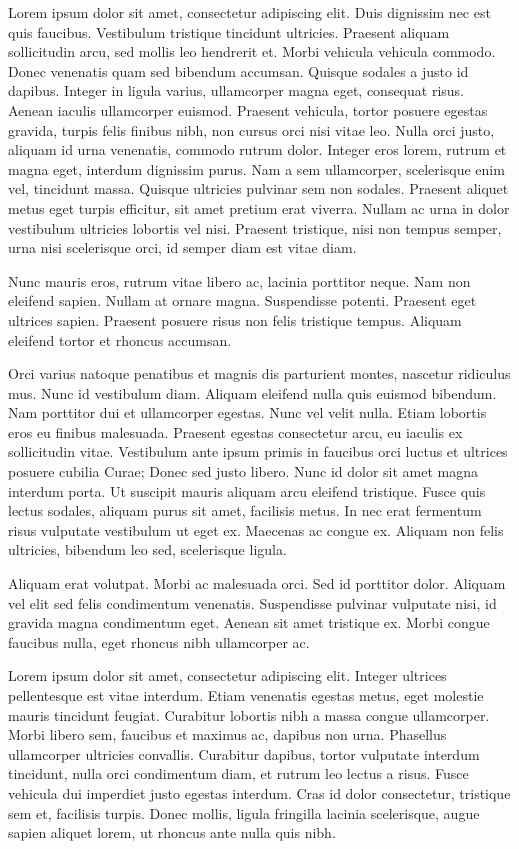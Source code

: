 \documentclass[a4paper,10pt,twoside]{article} %
\begin{document}
Lorem ipsum dolor sit amet, consectetur adipiscing elit.
Duis dignissim nec est quis faucibus.
Vestibulum tristique tincidunt ultricies.
Praesent aliquam sollicitudin arcu, sed mollis leo hendrerit et.
Morbi vehicula vehicula commodo.
Donec venenatis quam sed bibendum accumsan.
Quisque sodales a justo id dapibus.
Integer in ligula varius, ullamcorper magna eget, consequat risus.
Aenean iaculis ullamcorper euismod.
Praesent vehicula, tortor posuere egestas gravida, turpis felis finibus nibh, non cursus orci nisi vitae leo.
Nulla orci justo, aliquam id urna venenatis, commodo rutrum dolor.
Integer eros lorem, rutrum et magna eget, interdum dignissim purus.
Nam a sem ullamcorper, scelerisque enim vel, tincidunt massa.
Quisque ultricies pulvinar sem non sodales.
Praesent aliquet metus eget turpis efficitur, sit amet pretium erat viverra.
Nullam ac urna in dolor vestibulum ultricies lobortis vel nisi.
Praesent tristique, nisi non tempus semper, urna nisi scelerisque orci, id semper diam est vitae diam.

Nunc mauris eros, rutrum vitae libero ac, lacinia porttitor neque.
Nam non eleifend sapien.
Nullam at ornare magna.
Suspendisse potenti.
Praesent eget ultrices sapien.
Praesent posuere risus non felis tristique tempus.
Aliquam eleifend tortor et rhoncus accumsan.

Orci varius natoque penatibus et magnis dis parturient montes, nascetur ridiculus mus.
Nunc id vestibulum diam.
Aliquam eleifend nulla quis euismod bibendum.
Nam porttitor dui et ullamcorper egestas.
Nunc vel velit nulla.
Etiam lobortis eros eu finibus malesuada.
Praesent egestas consectetur arcu, eu iaculis ex sollicitudin vitae.
Vestibulum ante ipsum primis in faucibus orci luctus et ultrices posuere cubilia Curae; Donec sed justo libero.
Nunc id dolor sit amet magna interdum porta.
Ut suscipit mauris aliquam arcu eleifend tristique.
Fusce quis lectus sodales, aliquam purus sit amet, facilisis metus.
In nec erat fermentum risus vulputate vestibulum ut eget ex.
Maecenas ac congue ex.
Aliquam non felis ultricies, bibendum leo sed, scelerisque ligula.

Aliquam erat volutpat.
Morbi ac malesuada orci.
Sed id porttitor dolor.
Aliquam vel elit sed felis condimentum venenatis.
Suspendisse pulvinar vulputate nisi, id gravida magna condimentum eget.
Aenean sit amet tristique ex.
Morbi congue faucibus nulla, eget rhoncus nibh ullamcorper ac.

Lorem ipsum dolor sit amet, consectetur adipiscing elit.
Integer ultrices pellentesque est vitae interdum.
Etiam venenatis egestas metus, eget molestie mauris tincidunt feugiat.
Curabitur lobortis nibh a massa congue ullamcorper.
Morbi libero sem, faucibus et maximus ac, dapibus non urna.
Phasellus ullamcorper ultricies convallis.
Curabitur dapibus, tortor vulputate interdum tincidunt, nulla orci condimentum diam, et rutrum leo lectus a risus.
Fusce vehicula dui imperdiet justo egestas interdum.
Cras id dolor consectetur, tristique sem et, facilisis turpis.
Donec mollis, ligula fringilla lacinia scelerisque, augue sapien aliquet lorem, ut rhoncus ante nulla quis nibh.
\end{document}
